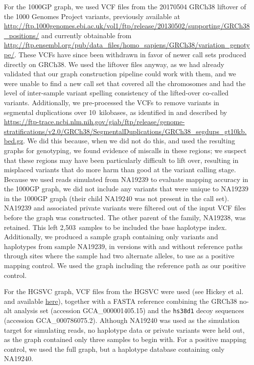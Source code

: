 \documentclass[11pt]{ucscthesis}
\begin{document}
For the 1000GP graph, we used VCF files from the 20170504 GRCh38 liftover of the 1000 Genomes Project variants, previously available at \url{http://ftp.1000genomes.ebi.ac.uk/vol1/ftp/release/20130502/supporting/GRCh38_positions/} and currently obtainable from \url{http://ftp.ensembl.org/pub/data_files/homo_sapiens/GRCh38/variation_genotype/}.
These VCFs have since been withdrawn in favor of newer call sets produced directly on GRCh38.
We used the liftover files anyway, as we had already validated that our graph construction pipeline could work with them, and we were unable to find a new call set that covered all the chromosomes and had the level of inter-sample variant spelling consistency of the lifted-over co-called variants.
Additionally, we pre-processed the VCFs to remove variants in segmental duplications over 10~kilobases, as identified in \cite{krusche2019best} and described by \url{https://ftp-trace.ncbi.nlm.nih.gov/giab/ftp/release/genome-stratifications/v2.0/GRCh38/SegmentalDuplications/GRCh38_segdups_gt10kb.bed.gz}.
We did this because, when we did not do this, and used the resulting graphs for genotyping, we found evidence of miscalls in these regions; we suspect that these regions may have been particularly difficult to lift over, resulting in misplaced variants that do more harm than good at the variant calling stage.
Because we used reads simulated from NA19239 to evaluate mapping accuracy in the 1000GP graph, we did not include any variants that were unique to NA19239 in the 1000GP graph (their child NA19240 was not present in the call set).
NA19239 and associated private variants were filtered out of the input VCF files before the graph was constructed.
The other parent of the family, NA19238, was retained.
This left 2,503~samples to be included the base haplotype index.
Additionally, we produced a sample graph containing only variants and haplotypes from sample NA19239, in versions with and without reference paths through sites where the sample had two alternate alleles, to use as a positive mapping control.
We used the graph including the reference path as our positive control.

For the HGSVC graph, VCF files from the HGSVC were used (see Hickey et al.\cite{hickey_vgsv_2020} and available \href{https://github.com/vgteam/sv-genotyping-paper/tree/master/human/hgsvc}{{here}}), together with a FASTA reference combining the GRCh38 no-alt analysis set (accession GCA\_000001405.15) and the \texttt{hs38d1} decoy sequences (accession GCA\_000786075.2).
Although NA19240 was used as the simulation target for simulating reads, no haplotype data or private variants were held out, as the graph contained only three samples to begin with. For a positive mapping control, we used the full graph, but a haplotype database containing only NA19240.
\end{document}

